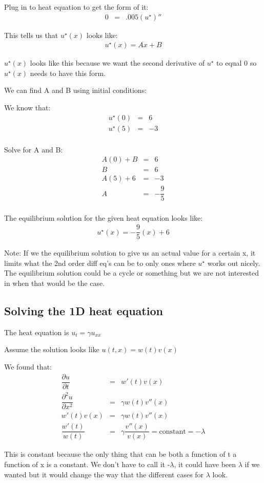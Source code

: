\documentclass{article}
\newcommand{\bea}{\begin{eqnarray*}}
\newcommand{\eea}{\end{eqnarray*}}
\newcommand{\blue}[1]{\textcolor{blue}{#1}}
\begin{document}
Plug in to heat equation to get the form of it:
\bea
0 &=& .005(u^{\star})''
\eea

This tells us that $u^{\star}(x)$ looks like:
\bea
u^{\star}(x) = Ax + B
\eea

$u^{\star}(x)$ looks like this because we want the second derivative of $u^{\star}$ to equal 0 so $u^{\star}(x)$ needs to have this form. 

We can find A and B using initial conditions:

We know that:
\bea
u^{\star}(0) &=& 6 \\
u^{\star}(5) &=& -3 \\
\eea

Solve for A and B:
\bea
A(0) + B &=& 6\\
B &=& 6 \\
A(5) + 6 &=& -3 \\
A &=& -\dfrac{9}{5} \\
\eea

The equilibrium solution for the given heat equation looks like:
\bea
u^{\star}(x)=-\dfrac{9}{5}(x) + 6
\eea

Note: If we the equilibrium solution to give us an actual value for a certain x, it limits what the 2nd order diff eq's can be to only ones where $u^{\star}$ works out nicely. The equilibrium solution could be a cycle or something but we are not interested in when that would be the case. 

\subsection{Solving the 1D heat equation}
The heat equation is $u_t = \gamma u_{xx}$

Assume the solution looks like $u(t,x) = w(t)v(x)$

We found that:
\bea
\dfrac{\partial u}{\partial t} &=& w'(t)v(x) \\
\dfrac{\partial^2 u}{\partial x^2} &=& \gamma w(t)v''(x) \\
w'(t)v(x) &=& \gamma w(t)v''(x) \\
\dfrac{w'(t)}{w(t)} &=& \gamma \dfrac{v''(x)}{v(x)} = \mbox{constant} = -\lambda
\eea

This is constant because the only thing that can be both a function of t a function of x is a constant. We don't have to call it -$\lambda$, it could have been $\lambda$ if we wanted but it would change the way that the different cases for $\lambda$ look. \newline
\end{document}
